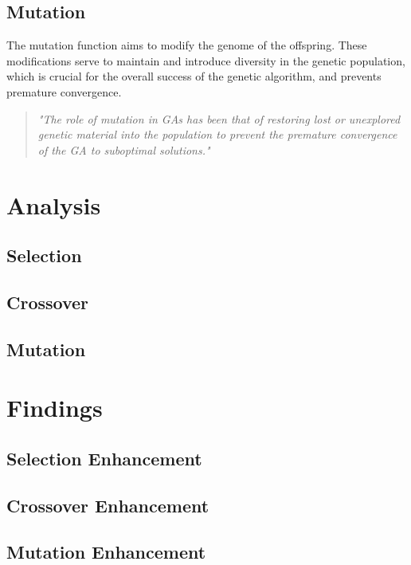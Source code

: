 \documentclass[a4paper, twocolumn]{article}
\begin{document}
\subsection{Mutation\label{sec:Mutation}}
 
The mutation function aims to modify the genome of the offspring. These modifications serve to maintain and introduce diversity in the genetic population, which is crucial for the overall success of the genetic algorithm, and prevents premature convergence.
\begin{quote}
\emph{
    "The role of mutation in GAs has been that of restoring lost or unexplored genetic material into the population to prevent the premature convergence of the GA to suboptimal solutions."
    }
    \cite{srinvas1994adaptive}
\end{quote}

\section{Analysis\label{sec:Analysis}}
\subsection{Selection\label{sec:Selection}}
\subsection{Crossover\label{sec:Crossover}}
\subsection{Mutation\label{sec:Mutation}}

\section{Findings\label{sec:Findings}}
\subsection{Selection Enhancement\label{sec:Selection Enhancement}}
\subsection{Crossover Enhancement\label{sec:Crossover Enhancement}}
\subsection{Mutation Enhancement\label{sec:Mutation Enhancement}}
\printbibliography
\end{document}

